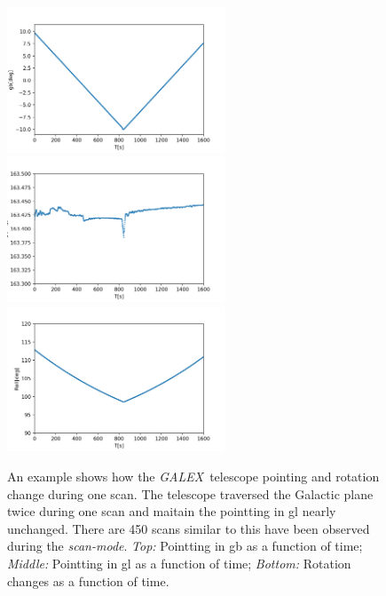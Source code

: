 \documentclass[12pt, preprint]{aastex}
\newcommand{\project}[1]{\textsl{#1}}
\newcommand{\galex}{\project{GALEX}}
\newcommand{\scanmode}{\project{scan-mode}}
\begin{document}
\begin{figure}[p]
\begin{center}
\includegraphics[width=0.58\textwidth]{figures/01634_0001-gb}
\includegraphics[width=0.58\textwidth]{figures/01634_0001-gl}
\includegraphics[width=0.58\textwidth]{figures/01634_0001-roll}
\end{center}
\caption{%
  \label{telescope}
  An example shows how the \galex\ telescope pointing and rotation change during one scan.
  The telescope traversed the Galactic plane twice during one scan and maitain the pointting in gl nearly unchanged.
  There are 450 scans similar to this have been observed during the \scanmode. 
  \emph{Top:}  Pointting in gb as a function of time;
  \emph{Middle:} Pointting in gl as a function of time;
  \emph{Bottom:} Rotation changes as a function of time.
}
\end{figure}
\end{document}
